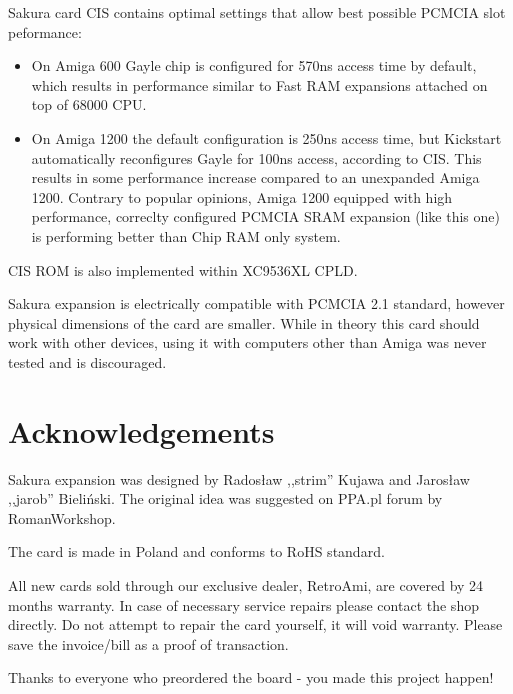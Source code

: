 \documentclass[10pt,a5paper]{article}
\begin{document}
Sakura card CIS contains optimal settings that allow best possible PCMCIA slot peformance:
\begin{itemize}
	\item On Amiga 600 Gayle chip is configured for 570ns access time by default, which results in performance similar to Fast RAM expansions attached on top of 68000 CPU.
	\item On Amiga 1200 the default configuration is 250ns access time, but Kickstart automatically reconfigures Gayle for 100ns access, according to CIS. This results in some performance increase compared to an unexpanded Amiga 1200. Contrary to popular opinions, Amiga 1200 equipped with high performance, correclty configured PCMCIA SRAM expansion (like this one) is performing better than Chip RAM only system.
\end{itemize}

CIS ROM is also implemented within XC9536XL CPLD.

Sakura expansion is electrically compatible with PCMCIA 2.1 standard, however physical dimensions of the card are smaller. While in theory this card should work with other devices, using it with computers other than Amiga was never tested and is discouraged.

\section*{Acknowledgements}

Sakura expansion was designed by Radosław ,,strim'' Kujawa and Jarosław ,,jarob'' Bieliński. The original idea was suggested on PPA.pl forum by RomanWorkshop. 

The card is made in Poland and conforms to RoHS standard. 

All new cards sold through our exclusive dealer, RetroAmi, are covered by 24 months warranty. In case of necessary service repairs please contact the shop directly. Do not attempt to repair the card yourself, it will void warranty. Please save the invoice/bill as a proof of transaction.

Thanks to everyone who preordered the board - you made this project happen!
\end{document}
